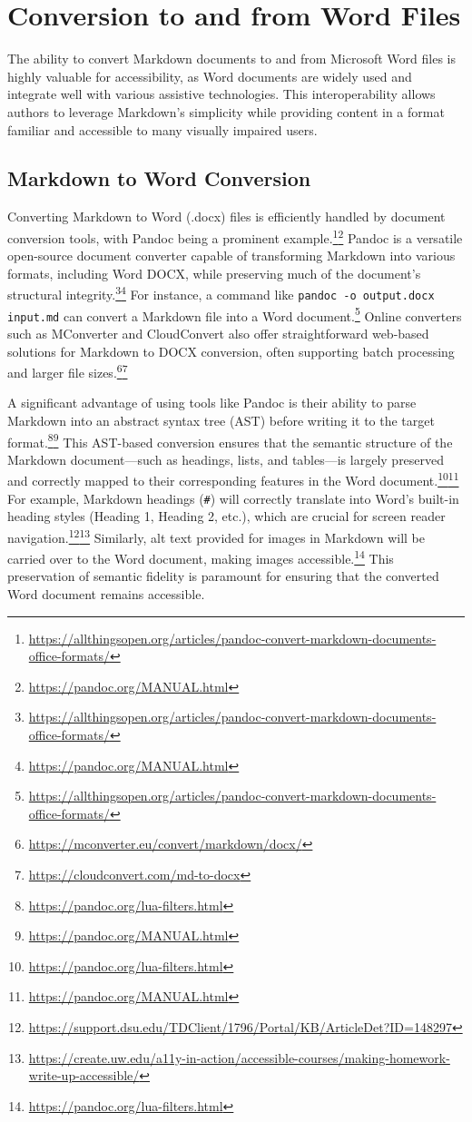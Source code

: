\section{Conversion to and from Word Files}
\label{sec:markdown-word}

The ability to convert Markdown documents to and from Microsoft Word files is highly valuable for accessibility, as Word documents are widely used and integrate well with various assistive technologies. This interoperability allows authors to leverage Markdown's simplicity while providing content in a format familiar and accessible to many visually impaired users.

\subsection{Markdown to Word Conversion}
Converting Markdown to Word (.docx) files is efficiently handled by document conversion tools, with Pandoc being a prominent example.\footnote{\url{https://allthingsopen.org/articles/pandoc-convert-markdown-documents-office-formats/}}\footnote{\url{https://pandoc.org/MANUAL.html}} Pandoc is a versatile open-source document converter capable of transforming Markdown into various formats, including Word DOCX, while preserving much of the document's structural integrity.\footnote{\url{https://allthingsopen.org/articles/pandoc-convert-markdown-documents-office-formats/}}\footnote{\url{https://pandoc.org/MANUAL.html}} For instance, a command like \texttt{pandoc -o output.docx input.md} can convert a Markdown file into a Word document.\footnote{\url{https://allthingsopen.org/articles/pandoc-convert-markdown-documents-office-formats/}} Online converters such as MConverter and CloudConvert also offer straightforward web-based solutions for Markdown to DOCX conversion, often supporting batch processing and larger file sizes.\footnote{\url{https://mconverter.eu/convert/markdown/docx/}}\footnote{\url{https://cloudconvert.com/md-to-docx}}

A significant advantage of using tools like Pandoc is their ability to parse Markdown into an abstract syntax tree (AST) before writing it to the target format.\footnote{\url{https://pandoc.org/lua-filters.html}}\footnote{\url{https://pandoc.org/MANUAL.html}} This AST-based conversion ensures that the semantic structure of the Markdown document---such as headings, lists, and tables---is largely preserved and correctly mapped to their corresponding features in the Word document.\footnote{\url{https://pandoc.org/lua-filters.html}}\footnote{\url{https://pandoc.org/MANUAL.html}} For example, Markdown headings (\texttt{\#}) will correctly translate into Word's built-in heading styles (Heading 1, Heading 2, etc.), which are crucial for screen reader navigation.\footnote{\url{https://support.dsu.edu/TDClient/1796/Portal/KB/ArticleDet?ID=148297}}\footnote{\url{https://create.uw.edu/a11y-in-action/accessible-courses/making-homework-write-up-accessible/}} Similarly, alt text provided for images in Markdown will be carried over to the Word document, making images accessible.\footnote{\url{https://pandoc.org/lua-filters.html}} This preservation of semantic fidelity is paramount for ensuring that the converted Word document remains accessible.

